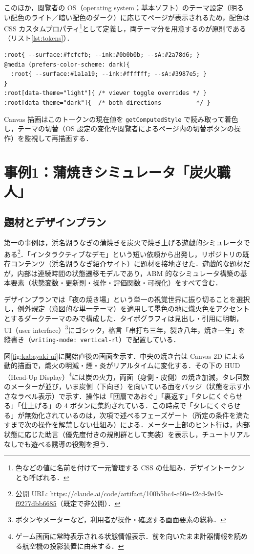 \documentclass[a4paper]{jlreq}
\begin{document}
このほか，閲覧者の OS（operating system；基本ソフト）のテーマ設定（明るい配色のライト／暗い配色のダーク）に応じてページが表示されるため，配色は CSS カスタムプロパティ\footnote{色などの値に名前を付けて一元管理する CSS の仕組み．デザイントークンとも呼ばれる．}として定義し，両テーマ分を用意するのが原則である（リスト\ref{lst:tokens}）．

\begin{lstlisting}[caption={テーマ・トークンの定義パターン（抜粋）},label={lst:tokens}]
:root{ --surface:#fcfcfb; --ink:#0b0b0b; --sA:#2a78d6; }
@media (prefers-color-scheme: dark){
  :root{ --surface:#1a1a19; --ink:#ffffff; --sA:#3987e5; }
}
:root[data-theme="light"]{ /* viewer toggle overrides */ }
:root[data-theme="dark"]{  /* both directions          */ }
\end{lstlisting}

Canvas 描画はこのトークンの現在値を \texttt{getComputedStyle} で読み取って着色し，テーマの切替（OS 設定の変化や閲覧者によるページ内の切替ボタンの操作）を監視して再描画する．

\section{事例1：蒲焼きシミュレータ「炭火職人」}\label{sec:kabayaki}

\subsection{題材とデザインプラン}

第一の事例は，浜名湖うなぎの蒲焼きを炭火で焼き上げる遊戯的シミュレータである\footnote{公開 URL: \url{https://claude.ai/code/artifact/100b5bc4-c60e-42cd-9e19-f9277dbb6685}（既定で非公開）．}．「インタラクティブなデモ」という短い依頼から出発し，リポジトリの既存コンテンツ（浜名湖うなぎ紹介サイト）に題材を接地させた．遊戯的な題材だが，内部は連続時間の状態遷移モデルであり，ABM 的なシミュレータ構築の基本要素（状態変数・更新則・操作・評価関数・可視化）をすべて含む．

デザインプランでは「夜の焼き場」という単一の視覚世界に振り切ることを選択し，例外規定（意図的な単一テーマ）を適用して墨色の地に熾火色をアクセントとするダークテーマのみで構成した．タイポグラフィは見出し・引用に明朝，UI（user interface）\footnote{ボタンやメーターなど，利用者が操作・確認する画面要素の総称．}にゴシック，格言「串打ち三年，裂き八年，焼き一生」を縦書き（\texttt{writing-mode: vertical-rl}）で配置している．

図\ref{fig:kabayaki-ui}に開始直後の画面を示す．中央の焼き台は Canvas 2D による動的描画で，熾火の明滅・煙・炎がリアルタイムに変化する．その下の HUD（Head-Up Display）\footnote{ゲーム画面に常時表示される状態情報表示．前を向いたまま計器情報を読める航空機の投影装置に由来する．}には炭の火力，両面（身側・皮側）の焼き加減，タレ回数のメーターが並び，いま炭側（下向き）を向いている面をバッジ（状態を示す小さなラベル表示）で示す．操作は「団扇であおぐ」「裏返す」「タレにくぐらせる」「仕上げる」の 4 ボタンに集約されている．この時点で「タレにくぐらせる」が無効化されているのは，次項で述べるフェーズゲート（所定の条件を満たすまで次の操作を解禁しない仕組み）による．メーター上部のヒント行は，内部状態に応じた助言（優先度付きの規則群として実装）を表示し，チュートリアルなしでも遊べる誘導の役割を担う．
\end{document}
